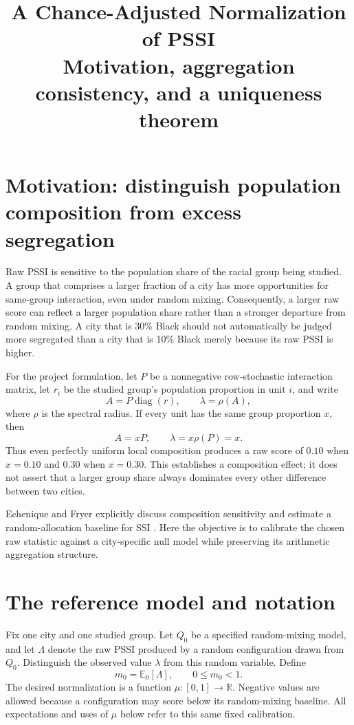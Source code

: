\documentclass[11pt]{article}
\title{A Chance-Adjusted Normalization of PSSI\\[0.3em]
\large Motivation, aggregation consistency, and a uniqueness theorem}
\author{}
\date{}
\newcommand{\E}{\mathbb{E}}
\newcommand{\R}{\mathbb{R}}
\begin{document}
\maketitle
\vspace{-1.5em}

\section{Motivation: distinguish population composition from excess segregation}

Raw PSSI is sensitive to the population share of the racial group being studied.
A group that comprises a larger fraction of a city has more opportunities for
same-group interaction, even under random mixing. Consequently, a larger raw
score can reflect a larger population share rather than a stronger departure
from random mixing. A city that is 30\% Black should not automatically be judged
more segregated than a city that is 10\% Black merely because its raw PSSI is
higher.

For the project formulation, let $P$ be a nonnegative row-stochastic interaction
matrix, let $r_i$ be the studied group's population proportion in unit $i$, and
write
\begin{equation}
 A=P\operatorname{diag}(r),\qquad \lambda=\rho(A),
 \label{eq:raw}
\end{equation}
where $\rho$ is the spectral radius. If every unit has the same group proportion
$x$, then
\[
 A=xP,\qquad \lambda=x\rho(P)=x.
\]
Thus even perfectly uniform local composition produces a raw score of $0.10$
when $x=0.10$ and $0.30$ when $x=0.30$. This establishes a composition effect;
it does not assert that a larger group share always dominates every other
difference between two cities.

Echenique and Fryer explicitly discuss composition sensitivity and estimate a
random-allocation baseline for SSI \cite[Section VI.B, manuscript p.~25]{EF}. Here the objective
is to calibrate the chosen raw statistic against a city-specific null model
while preserving its arithmetic aggregation structure.

\section{The reference model and notation}

Fix one city and one studied group. Let $Q_0$ be a specified random-mixing model,
and let $\Lambda$ denote the raw PSSI produced by a random configuration drawn
from $Q_0$. Distinguish the observed value $\lambda$ from this random variable.
Define
\begin{equation}
 m_0=\E_0[\Lambda],\qquad 0\leq m_0<1.
 \label{eq:baseline}
\end{equation}
The desired normalization is a function $\mu:[0,1]\to\R$. Negative values are
allowed because a configuration may score below its random-mixing baseline.
All expectations and uses of $\mu$ below refer to this same fixed calibration.
\end{document}
